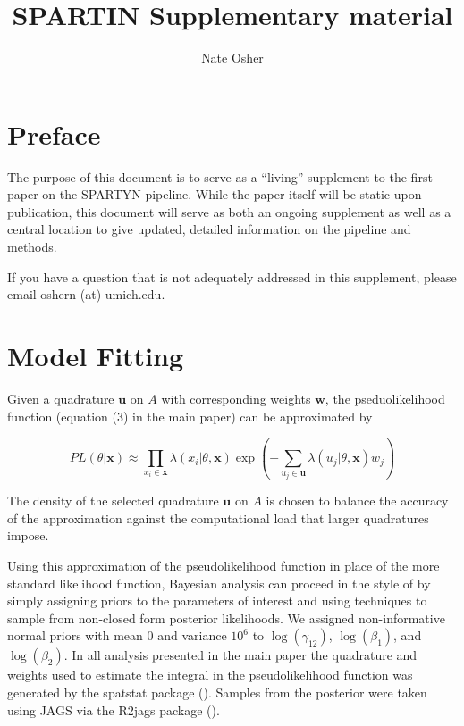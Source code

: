 \documentclass[
]{book}
\title{SPARTIN Supplementary material}
\author{Nate Osher}
\date{}
\begin{document}
\maketitle

{
\setcounter{tocdepth}{1}
\tableofcontents
}
\newcommand{\vb}[1]{\textcolor{blue}{\textsf{#1}}}
\newcommand{\no}[1]{\textcolor{red}{\textsf{[#1]}}}
\newcommand{\jk}[1]{\textcolor{violet}{\textsf{[JK: #1]}}}
\newcommand{\bs}[1]{{\boldsymbol{#1}}}
\newcommand{\bm}[1]{{\mathbf{#1}}}

\hypertarget{preface}{%
\chapter{Preface}\label{preface}}

The purpose of this document is to serve as a ``living'' supplement to the
first paper on the SPARTYN pipeline. While the paper itself will be
static upon publication, this document will serve as both an ongoing
supplement as well as a central location to give updated, detailed
information on the pipeline and methods.

If you have a question that is not adequately addressed in this
supplement, please email oshern (at) umich.edu.

\hypertarget{model-fitting}{%
\chapter{Model Fitting}\label{model-fitting}}

Given a quadrature \({\mathbf{u}}\) on \(A\) with corresponding weights \({\mathbf{w}}\), the pseduolikelihood function (equation (3) in the main paper) can be approximated by

\begin{equation}
\label{eqn:PL_approx}
PL(\theta | {\mathbf{x}}) \approx
\prod_{x_i \in {\mathbf{x}}} \lambda(x_i | \theta, {\mathbf{x}}) \exp(-\sum_{u_j \in {\mathbf{u}}} \lambda(u_j | \theta, {\mathbf{x}}) w_j) \tag{S1}
\end{equation}

The density of the selected quadrature \({\mathbf{u}}\) on \(A\) is chosen to balance the accuracy of the approximation against the computational load that larger quadratures impose.

Using this approximation of the pseudolikelihood function in place of the more standard likelihood function, Bayesian analysis can proceed in the style of \citet{King12} by simply assigning priors to the parameters of interest and using techniques to sample from non-closed form posterior likelihoods. We assigned non-informative normal priors with mean 0 and variance \(10^6\) to \(\log(\gamma_{12})\), \(\log(\beta_1)\), and \(\log(\beta_2)\). In all analysis presented in the main paper the quadrature and weights used to estimate the integral in the pseudolikelihood function was generated by the spatstat package (\citet{BT05}). Samples from the posterior were taken using JAGS via the R2jags package (\citet{Su15}).
\end{document}
